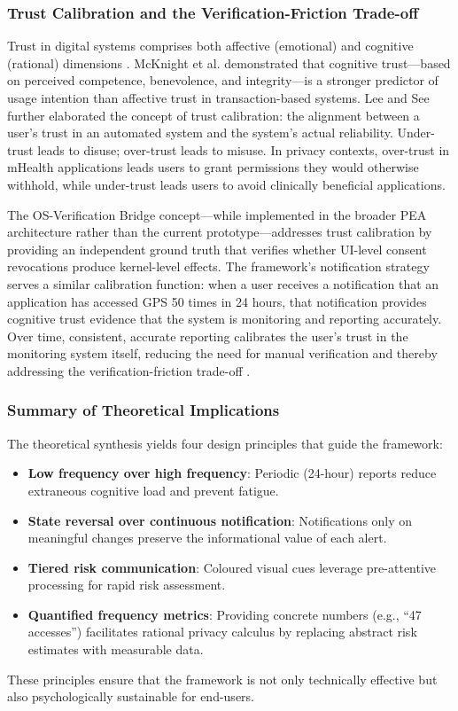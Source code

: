 \subsubsection{Trust Calibration and the Verification-Friction Trade-off}
Trust in digital systems comprises both affective (emotional) and cognitive (rational) dimensions \cite{33}. McKnight et al. \cite{33} demonstrated that cognitive trust—based on perceived competence, benevolence, and integrity—is a stronger predictor of usage intention than affective trust in transaction-based systems. Lee and See \cite{34} further elaborated the concept of trust calibration: the alignment between a user's trust in an automated system and the system's actual reliability. Under-trust leads to disuse; over-trust leads to misuse. In privacy contexts, over-trust in mHealth applications leads users to grant permissions they would otherwise withhold, while under-trust leads users to avoid clinically beneficial applications.

The OS-Verification Bridge concept—while implemented in the broader PEA architecture rather than the current prototype—addresses trust calibration by providing an independent ground truth that verifies whether UI-level consent revocations produce kernel-level effects. The framework's notification strategy serves a similar calibration function: when a user receives a notification that an application has accessed GPS 50 times in 24 hours, that notification provides cognitive trust evidence that the system is monitoring and reporting accurately. Over time, consistent, accurate reporting calibrates the user's trust in the monitoring system itself, reducing the need for manual verification and thereby addressing the verification-friction trade-off \cite{34}.

\subsubsection{Summary of Theoretical Implications}
The theoretical synthesis yields four design principles that guide the framework:
\begin{itemize}
    \item \textbf{Low frequency over high frequency}: Periodic (24-hour) reports reduce extraneous cognitive load and prevent fatigue.
    \item \textbf{State reversal over continuous notification}: Notifications only on meaningful changes preserve the informational value of each alert.
    \item \textbf{Tiered risk communication}: Coloured visual cues leverage pre-attentive processing for rapid risk assessment.
    \item \textbf{Quantified frequency metrics}: Providing concrete numbers (e.g., ``47 accesses'') facilitates rational privacy calculus by replacing abstract risk estimates with measurable data.
\end{itemize}
These principles ensure that the framework is not only technically effective but also psychologically sustainable for end-users.

